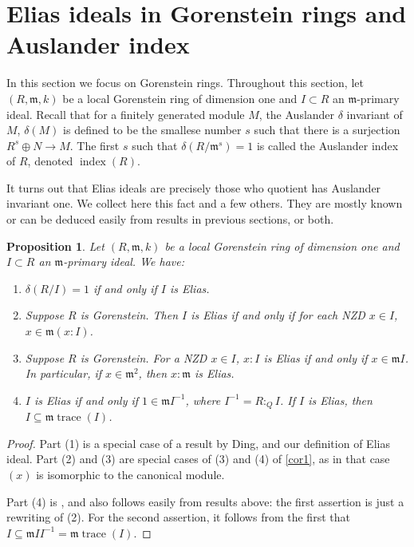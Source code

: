 \documentclass[a4paper,12pt]{amsart}
\newtheorem{prop}[thm]{\bf Proposition}
\theoremstyle{definition}
\theoremstyle{remark}
\numberwithin{equation}{section}
\DeclareMathOperator{\tr}{{trace}}
\DeclareMathOperator{\ind}{{index}}
\def\fm{\mathfrak{m}}
\begin{document}
\section{Elias ideals in Gorenstein rings and Auslander index}\label{sec4} 

In this section we focus on Gorenstein rings. Throughout this section, let $(R, \fm, k)$ be a local Gorenstein ring of dimension one and $I\subset R$ an $\fm$-primary ideal. Recall that for a finitely generated module $M$, the Auslander $\delta$ invariant of $M$, $\delta(M)$ is defined to be the smallese number $s$ such that there is a surjection $R^s\oplus N\to M$. The first $s$ such that $\delta(R/\fm^s)=1$ is called the Auslander index of $R$, denoted $\ind(R)$. 

It turns out that Elias ideals are precisely those who quotient has Auslander invariant one. We collect here this fact and a few others. They are mostly known or can be deduced easily from results in previous sections, or both.  

\begin{prop}\label{GorThm} Let $(R, \fm, k)$ be a local Gorenstein ring of dimension one and $I\subset R$ an $\fm$-primary ideal. We have:
\begin{enumerate}
\item $\delta(R/I) = 1$ if and only if $I$ is Elias. 
\item Suppose $R$ is Gorenstein. Then $I$ is Elias if and only if for each NZD $x\in I$, $x\in \fm(x:I)$. 
\item Suppose $R$ is Gorenstein. For a NZD $x\in I$, $x:I$ is Elias if and only if $x\in \fm{I}$. In particular, if $x\in \fm^2$, then $x:\fm$ is Elias. 
\item $I$ is Elias if and only if  $1 \in \fm{I^{-1}}$, where $I^{-1}= R:_{Q}I$. If $I$ is Elias, then $I\subseteq \fm\tr(I)$.


\end{enumerate}

\end{prop}


\begin{proof}
Part (1) is a special case of a result  by Ding, \cite[Proposition 1.2]{Din} and our definition of Elias ideal. Part (2) and (3) are special cases of (3) and (4) of \ref{cor1}, as in that case $(x)$ is isomorphic to the canonical module.

Part (4) is \cite[2.4, 2.5]{Din}, and also follows easily from results above: the first assertion is just a rewriting of (2).  For the second assertion, it follows from the first that $I\subseteq \fm II^{-1} = \fm\tr(I)$. 
\end{proof}
\end{document}
